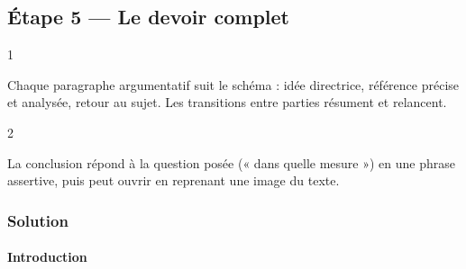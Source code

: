 \documentclass[11pt,a4paper]{article}
\begin{document}
\hypertarget{uxe9tape-5-le-devoir-complet}{%
\subsection{Étape 5 --- Le devoir complet}\label{uxe9tape-5-le-devoir-complet}}

\begin{indication}{1}

Chaque paragraphe argumentatif suit le schéma : idée directrice, référence précise et analysée, retour au sujet. Les transitions entre parties résument et relancent.

\end{indication}

\begin{indication}{2}

La conclusion répond à la question posée (« dans quelle mesure ») en une phrase assertive, puis peut ouvrir en reprenant une image du texte.

\end{indication}

\hypertarget{solution-7}{%
\subsubsection{Solution}\label{solution-7}}

\hypertarget{introduction}{%
\paragraph{Introduction}\label{introduction}}
\end{document}
